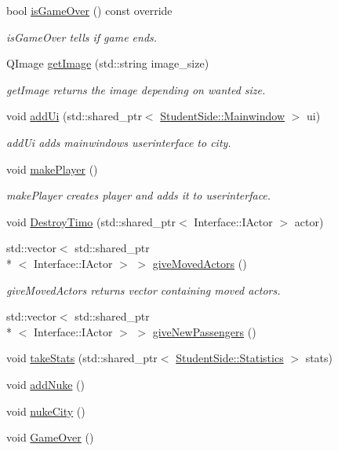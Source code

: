 \begin{DoxyCompactItemize}
bool \hyperlink{class_student_side_1_1_city_a9ca889641234d84e92fa97b999ae1ee4}{is\-Game\-Over} () const override
\begin{DoxyCompactList}\small\item\em is\-Game\-Over tells if game ends. \end{DoxyCompactList}\item 
Q\-Image \hyperlink{class_student_side_1_1_city_ab3ac8687f8213b2a26484214a7925dc2}{get\-Image} (std\-::string image\-\_\-size)
\begin{DoxyCompactList}\small\item\em get\-Image returns the image depending on wanted size. \end{DoxyCompactList}\item 
void \hyperlink{class_student_side_1_1_city_a5d7dffa807359354d94bd031fb207767}{add\-Ui} (std\-::shared\-\_\-ptr$<$ \hyperlink{class_student_side_1_1_mainwindow}{Student\-Side\-::\-Mainwindow} $>$ ui)
\begin{DoxyCompactList}\small\item\em add\-Ui adds mainwindows userinterface to city. \end{DoxyCompactList}\item 
void \hyperlink{class_student_side_1_1_city_a9e77dd00ce37d3467bb078d0fb7b3cca}{make\-Player} ()
\begin{DoxyCompactList}\small\item\em make\-Player creates player and adds it to userinterface. \end{DoxyCompactList}\item 
void \hyperlink{class_student_side_1_1_city_a3f0375a49769a2a3456853a354732efe}{Destroy\-Timo} (std\-::shared\-\_\-ptr$<$ Interface\-::\-I\-Actor $>$ actor)
\item 
std\-::vector$<$ std\-::shared\-\_\-ptr\\*
$<$ Interface\-::\-I\-Actor $>$ $>$ \hyperlink{class_student_side_1_1_city_ab12fa6213daf693fc5602317c04c363c}{give\-Moved\-Actors} ()
\begin{DoxyCompactList}\small\item\em give\-Moved\-Actors returns vector containing moved actors. \end{DoxyCompactList}\item 
std\-::vector$<$ std\-::shared\-\_\-ptr\\*
$<$ Interface\-::\-I\-Actor $>$ $>$ \hyperlink{class_student_side_1_1_city_a2e0283747d6ad3d03b445d9def9780cb}{give\-New\-Passengers} ()
\item 
void \hyperlink{class_student_side_1_1_city_a4030f4a976670a9d33b990f2c7d1f11c}{take\-Stats} (std\-::shared\-\_\-ptr$<$ \hyperlink{class_student_side_1_1_statistics}{Student\-Side\-::\-Statistics} $>$ stats)
\item 
void \hyperlink{class_student_side_1_1_city_a8daa819e3acf9ce4c7a51e2dd6d53895}{add\-Nuke} ()
\item 
void \hyperlink{class_student_side_1_1_city_af81fc684dc3cdc743d8a267e0de37f7b}{nuke\-City} ()
\item 
void \hyperlink{class_student_side_1_1_city_affc68915ee82bb32ab94e202d05402ca}{Game\-Over} ()
\end{DoxyCompactItemize}


